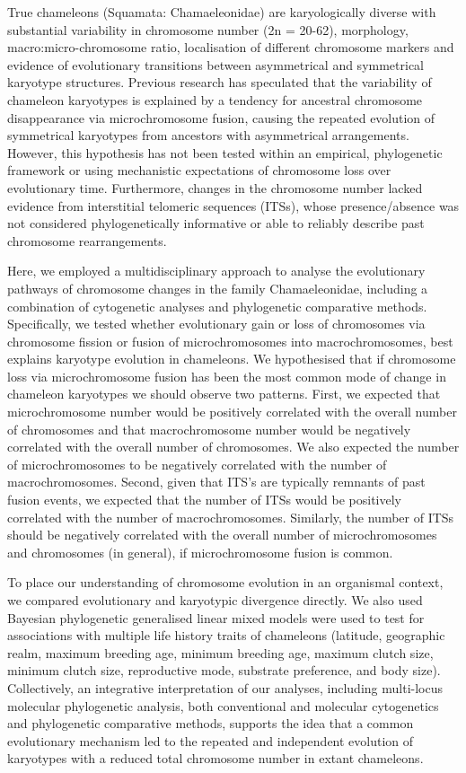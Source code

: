 \documentclass[a4paper, 12pt]{article}
\begin{document}
True chameleons (Squamata: Chamaeleonidae) are karyologically diverse with substantial variability in chromosome number (2n = 20-62), morphology, macro:micro-chromosome ratio, localisation of different chromosome markers and evidence of evolutionary transitions between asymmetrical and symmetrical karyotype structures\cite{rovatsos2017evolution,nielsen2018dynamic}.
Previous research has speculated that the variability of chameleon karyotypes is explained by a tendency for ancestral chromosome disappearance via microchromosome fusion\cite{rovatsos2017evolution}, causing the repeated evolution of symmetrical karyotypes from ancestors with asymmetrical arrangements. 
However, this hypothesis has not been tested within an empirical, phylogenetic framework or using mechanistic expectations of chromosome loss over evolutionary time. 
Furthermore, changes in the chromosome number lacked evidence from interstitial telomeric sequences (ITSs), whose presence/absence was not considered phylogenetically informative or able to reliably describe past chromosome rearrangements\cite{rovatsos2017evolution}.

Here, we employed a multidisciplinary approach to analyse the evolutionary pathways of chromosome changes in the family Chamaeleonidae, including a combination of cytogenetic analyses and phylogenetic comparative methods. 
Specifically, we tested whether evolutionary gain or loss of chromosomes via chromosome fission or fusion of microchromosomes into macrochromosomes, best explains karyotype evolution in chameleons. 
We hypothesised that if chromosome loss via microchromosome fusion has been the most common mode of change in chameleon karyotypes we should observe two patterns. 
First, we expected that microchromosome number would be positively correlated with the overall number of chromosomes and that macrochromosome number would be negatively correlated with the overall number of chromosomes. 
We also expected the number of microchromosomes to be negatively correlated with the number of macrochromosomes. 
Second, given that ITS’s are typically remnants of past fusion events\cite{bolzan2017interstitial}, we expected that the number of ITSs would be positively correlated with the number of macrochromosomes. 
Similarly, the number of ITSs should be negatively correlated with the overall number of microchromosomes and chromosomes (in general), if microchromosome fusion is common. 

To place our understanding of chromosome evolution in an organismal context, we compared evolutionary and karyotypic divergence directly. 
We also used Bayesian phylogenetic generalised linear mixed models were used to test for associations with multiple life history traits of chameleons (latitude, geographic realm, maximum breeding age, minimum breeding age, maximum clutch size, minimum clutch size, reproductive mode, substrate preference, and body size). 
Collectively, an integrative interpretation of our analyses, including multi-locus molecular phylogenetic analysis, both conventional and molecular cytogenetics and phylogenetic comparative methods, supports the idea that a common evolutionary mechanism led to the repeated and independent evolution of karyotypes with a reduced total chromosome number in extant chameleons.
\end{document}
